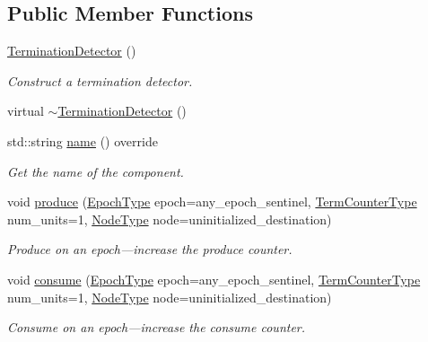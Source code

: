 \subsection*{Public Member Functions}
\begin{DoxyCompactItemize}
\item 
\hyperlink{structvt_1_1term_1_1_termination_detector_a9e6bc0a436aa1bb5f6b344ac795b3303}{Termination\+Detector} ()
\begin{DoxyCompactList}\small\item\em Construct a termination detector. \end{DoxyCompactList}\item 
virtual \hyperlink{structvt_1_1term_1_1_termination_detector_a1a1a29c2374a70427d8173ec31d55421}{$\sim$\+Termination\+Detector} ()
\item 
std\+::string \hyperlink{structvt_1_1term_1_1_termination_detector_a6cffc7850bc178af04fb542d50f82086}{name} () override
\begin{DoxyCompactList}\small\item\em Get the name of the component. \end{DoxyCompactList}\item 
void \hyperlink{structvt_1_1term_1_1_termination_detector_a3c31a1c36b5d55e9d28b5b26b2436573}{produce} (\hyperlink{namespacevt_a81d11b28122d43bf9834577e4a06440f}{Epoch\+Type} epoch=any\+\_\+epoch\+\_\+sentinel, \hyperlink{namespacevt_1_1term_a4fd378cdb0c36683afc1b3399d685f7f}{Term\+Counter\+Type} num\+\_\+units=1, \hyperlink{namespacevt_a866da9d0efc19c0a1ce79e9e492f47e2}{Node\+Type} node=uninitialized\+\_\+destination)
\begin{DoxyCompactList}\small\item\em Produce on an epoch---increase the produce counter. \end{DoxyCompactList}\item 
void \hyperlink{structvt_1_1term_1_1_termination_detector_a950215186c7303d99316ece6ea31c4cd}{consume} (\hyperlink{namespacevt_a81d11b28122d43bf9834577e4a06440f}{Epoch\+Type} epoch=any\+\_\+epoch\+\_\+sentinel, \hyperlink{namespacevt_1_1term_a4fd378cdb0c36683afc1b3399d685f7f}{Term\+Counter\+Type} num\+\_\+units=1, \hyperlink{namespacevt_a866da9d0efc19c0a1ce79e9e492f47e2}{Node\+Type} node=uninitialized\+\_\+destination)
\begin{DoxyCompactList}\small\item\em Consume on an epoch---increase the consume counter. \end{DoxyCompactList}\item 

\end{DoxyCompactItemize}

